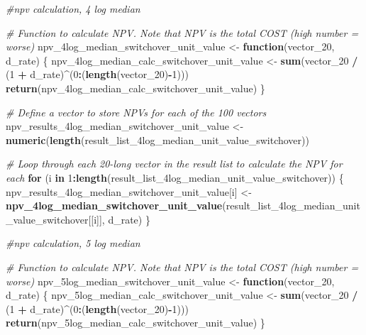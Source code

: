 \documentclass[
]{article}
\newenvironment{Shaded}{\begin{snugshade}}{\end{snugshade}}
\newcommand{\CommentTok}[1]{\textcolor[rgb]{0.56,0.35,0.01}{\textit{#1}}}
\newcommand{\ControlFlowTok}[1]{\textcolor[rgb]{0.13,0.29,0.53}{\textbf{#1}}}
\newcommand{\DecValTok}[1]{\textcolor[rgb]{0.00,0.00,0.81}{#1}}
\newcommand{\FunctionTok}[1]{\textcolor[rgb]{0.13,0.29,0.53}{\textbf{#1}}}
\newcommand{\NormalTok}[1]{#1}
\newcommand{\OtherTok}[1]{\textcolor[rgb]{0.56,0.35,0.01}{#1}}
\newcommand{\SpecialCharTok}[1]{\textcolor[rgb]{0.81,0.36,0.00}{\textbf{#1}}}
\begin{document}
\begin{Shaded}
\begin{Highlighting}[]
\CommentTok{\#npv calculation, 4 log median}


\CommentTok{\# Function to calculate NPV. Note that NPV is the total COST (high number = worse)}
\NormalTok{npv\_4log\_median\_switchover\_unit\_value }\OtherTok{\textless{}{-}} \ControlFlowTok{function}\NormalTok{(vector\_20, d\_rate) \{}
\NormalTok{  npv\_4log\_median\_calc\_switchover\_unit\_value }\OtherTok{\textless{}{-}} \FunctionTok{sum}\NormalTok{(vector\_20 }\SpecialCharTok{/}\NormalTok{ (}\DecValTok{1} \SpecialCharTok{+}\NormalTok{ d\_rate)}\SpecialCharTok{\^{}}\NormalTok{(}\DecValTok{0}\SpecialCharTok{:}\NormalTok{(}\FunctionTok{length}\NormalTok{(vector\_20)}\SpecialCharTok{{-}}\DecValTok{1}\NormalTok{)))}
  \FunctionTok{return}\NormalTok{(npv\_4log\_median\_calc\_switchover\_unit\_value)}
\NormalTok{\}}

\CommentTok{\# Define a vector to store NPVs for each of the 100 vectors}
\NormalTok{npv\_results\_4log\_median\_switchover\_unit\_value }\OtherTok{\textless{}{-}} \FunctionTok{numeric}\NormalTok{(}\FunctionTok{length}\NormalTok{(result\_list\_4log\_median\_unit\_value\_switchover))}

\CommentTok{\# Loop through each 20{-}long vector in the result list to calculate the NPV for each}
\ControlFlowTok{for}\NormalTok{ (i }\ControlFlowTok{in} \DecValTok{1}\SpecialCharTok{:}\FunctionTok{length}\NormalTok{(result\_list\_4log\_median\_unit\_value\_switchover)) \{}
\NormalTok{  npv\_results\_4log\_median\_switchover\_unit\_value[i] }\OtherTok{\textless{}{-}} \FunctionTok{npv\_4log\_median\_switchover\_unit\_value}\NormalTok{(result\_list\_4log\_median\_unit\_value\_switchover[[i]], d\_rate)}
\NormalTok{\}}



\CommentTok{\#npv calculation, 5 log median}


\CommentTok{\# Function to calculate NPV. Note that NPV is the total COST (high number = worse)}
\NormalTok{npv\_5log\_median\_switchover\_unit\_value }\OtherTok{\textless{}{-}} \ControlFlowTok{function}\NormalTok{(vector\_20, d\_rate) \{}
\NormalTok{  npv\_5log\_median\_calc\_switchover\_unit\_value }\OtherTok{\textless{}{-}} \FunctionTok{sum}\NormalTok{(vector\_20 }\SpecialCharTok{/}\NormalTok{ (}\DecValTok{1} \SpecialCharTok{+}\NormalTok{ d\_rate)}\SpecialCharTok{\^{}}\NormalTok{(}\DecValTok{0}\SpecialCharTok{:}\NormalTok{(}\FunctionTok{length}\NormalTok{(vector\_20)}\SpecialCharTok{{-}}\DecValTok{1}\NormalTok{)))}
  \FunctionTok{return}\NormalTok{(npv\_5log\_median\_calc\_switchover\_unit\_value)}
\NormalTok{\}}


\end{Highlighting}
\end{Shaded}
\end{document}
